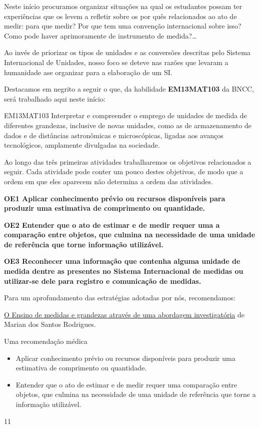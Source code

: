 \def\currentcolor{session1}
\begin{texto}
{
Neste início procuramos organizar situações na qual os estudantes possam ter experiências que os levem a refletir sobre os por quês relacionados ao ato de medir: para que medir? Por que tem uma convenção internacional sobre isso? Como pode haver aprimoramente de instrumento de medida?…

Ao invés de priorizar os tipos de unidades e as conversões descritas pelo Sistema Internacional de Unidades, nosso foco se deteve nas razões que levaram a humanidade ase organizar para a elaboração de um SI.

Destacamos em negrito a seguir o que, da habilidade \textbf{EM13MAT103} da BNCC, será trabalhado aqui neste início:

\begin{habilities}{EM13MAT103}
Interpretar e compreender o emprego de unidades de medida de diferentes grandezas, inclusive de novas unidades, como as de armazenamento de dados e de distâncias astronômicas e microscópicas, ligadas aos avanços tecnológicos, amplamente divulgadas na sociedade.
\end{habilities}


Ao longo das três primeiras atividades trabalharemos os objetivos relacionados a seguir. Cada atividade pode conter um pouco destes objetivos, de modo que a ordem em que eles aparecem não determina a ordem das atividades.

\textbf{OE1 Aplicar conhecimento prévio ou recursos disponíveis para produzir uma estimativa de comprimento ou quantidade.}

\textbf{OE2 Entender que o ato de estimar e de medir requer uma a comparação entre objetos, que culmina na necessidade de uma unidade de referência que torne informação utilizável.}

\textbf{OE3 Reconhecer uma informação que contenha alguma unidade de medida dentre as presentes no Sistema Internacional de medidas ou utilizar-se dele para registro e comunicação de medidas.}

Para um aprofundamento das estratégias adotadas por nós, recomendamos:

\href{https://repositorio.ufrn.br/jspui/bitstream/123456789/16034/1/MarianSR.pdf}{O Ensino de medidas e grandezas através de uma abordagem investigatória} de Marian dos Santos Rodrigues.
}
\end{texto}
\begin{objectives}{Uma recomendação médica}
{
\begin{itemize}
\item Aplicar conhecimento prévio ou recursos disponíveis para produzir uma estimativa de comprimento ou quantidade.
\item Entender que o ato de estimar e de medir requer uma comparação entre objetos, que culmina na necessidade de uma unidade de referência que torne a informação utilizável.
\end{itemize}
}{1}{1}
\end{objectives}

